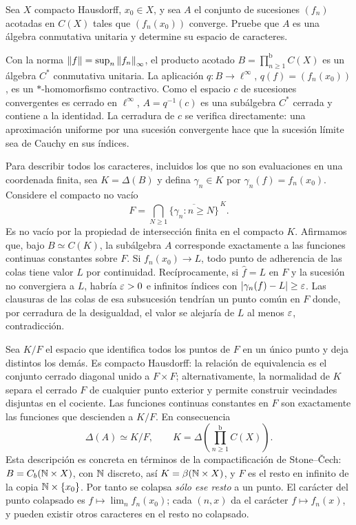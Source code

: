 \begin{ejercicio}\label{ej:v3-l26-6}
Sea $X$ compacto Hausdorff, $x_0\in X$, y sea $A$ el conjunto de sucesiones $(f_n)$ acotadas en $C(X)$ tales que $(f_n(x_0))$ converge. Pruebe que $A$ es una álgebra conmutativa unitaria y determine su espacio de caracteres.
\end{ejercicio}
\begin{solucion}
Con la norma $\left\lVert f\right\rVert=\sup_n\left\lVert f_n\right\rVert_\infty$, el producto acotado $B=\prod_{n\ge1}^{\mathrm b}C(X)$ es un álgebra $C^*$ conmutativa unitaria. La aplicación $q:B\to\ell^\infty$, $q(f)=(f_n(x_0))$, es un $*$-homomorfismo contractivo. Como el espacio $c$ de sucesiones convergentes es cerrado en $\ell^\infty$, $A=q^{-1}(c)$ es una subálgebra $C^*$ cerrada y contiene a la identidad. La cerradura de $c$ se verifica directamente: una aproximación uniforme por una sucesión convergente hace que la sucesión límite sea de Cauchy en sus índices.

Para describir todos los caracteres, incluidos los que no son evaluaciones en una coordenada finita, sea $K=\Delta(B)$ y defina $\gamma_n\in K$ por $\gamma_n(f)=f_n(x_0)$. Considere el compacto no vacío
\[
 F=\bigcap_{N\ge1}\overline{\{\gamma_n:n\ge N\}}^{\,K}.
\]
Es no vacío por la propiedad de intersección finita en el compacto $K$. Afirmamos que, bajo $B\simeq C(K)$, la subálgebra $A$ corresponde exactamente a las funciones continuas constantes sobre $F$. Si $f_n(x_0)\to L$, todo punto de adherencia de las colas tiene valor $L$ por continuidad. Recíprocamente, si $\widehat f=L$ en $F$ y la sucesión no convergiera a $L$, habría $\varepsilon>0$ e infinitos índices con $|\gamma_n(f)-L|\ge\varepsilon$. Las clausuras de las colas de esa subsucesión tendrían un punto común en $F$ donde, por cerradura de la desigualdad, el valor se alejaría de $L$ al menos $\varepsilon$, contradicción.

Sea $K/F$ el espacio que identifica todos los puntos de $F$ en un único punto y deja distintos los demás. Es compacto Hausdorff: la relación de equivalencia es el conjunto cerrado diagonal unido a $F\times F$; alternativamente, la normalidad de $K$ separa el cerrado $F$ de cualquier punto exterior y permite construir vecindades disjuntas en el cociente. Las funciones continuas constantes en $F$ son exactamente las funciones que descienden a $K/F$. En consecuencia
\[
 \boxed{\ \Delta(A)\simeq K/F,\qquad K=\Delta\!\left(\prod_{n\ge1}^{\mathrm b}C(X)\right).\ }
\]
Esta descripción es concreta en términos de la compactificación de Stone--Čech: $B=C_b(\mathbb N\times X)$, con $\mathbb N$ discreto, así $K=\beta(\mathbb N\times X)$, y $F$ es el resto en infinito de la copia $\mathbb N\times\{x_0\}$. Por tanto se colapsa \emph{sólo ese resto} a un punto. El carácter del punto colapsado es $f\mapsto\lim_n f_n(x_0)$; cada $(n,x)$ da el carácter $f\mapsto f_n(x)$, y pueden existir otros caracteres en el resto no colapsado.


\end{solucion}
